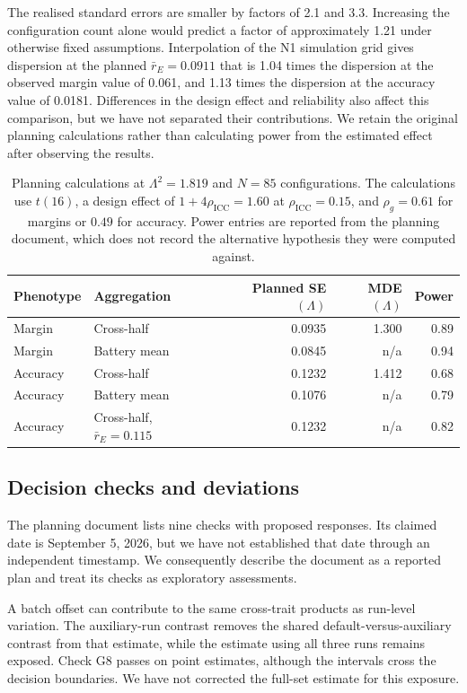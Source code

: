 The realised standard errors are smaller by factors of 2.1 and 3.3. Increasing the configuration count alone would predict a factor of approximately 1.21 under otherwise fixed assumptions. Interpolation of the N1 simulation grid gives dispersion at the planned $\bar r_E=0.0911$ that is 1.04 times the dispersion at the observed margin value of 0.061, and 1.13 times the dispersion at the accuracy value of 0.0181. Differences in the design effect and reliability also affect this comparison, but we have not separated their contributions. We retain the original planning calculations rather than calculating power from the estimated effect after observing the results.

\begin{table}[!htb]
\centering
\caption{Planning calculations at $\Lambda^2=1.819$ and $N=85$ configurations. The calculations use $t(16)$, a design effect of $1+4\rho_{\mathrm{ICC}}=1.60$ at $\rho_{\mathrm{ICC}}=0.15$, and $\rho_g=0.61$ for margins or $0.49$ for accuracy. Power entries are reported from the planning document, which does not record the alternative hypothesis they were computed against.}
\label{tab:original4}
\small\setlength{\tabcolsep}{4pt}\renewcommand{\arraystretch}{1.12}
\begin{tabular}{llrrr}\toprule
Phenotype & Aggregation & Planned SE$(\Lambda)$ & MDE$(\Lambda)$ & Power\\\midrule
Margin & Cross-half & 0.0935 & 1.300 & 0.89\\
Margin & Battery mean & 0.0845 & n/a & 0.94\\
Accuracy & Cross-half & 0.1232 & 1.412 & 0.68\\
Accuracy & Battery mean & 0.1076 & n/a & 0.79\\
Accuracy & Cross-half, $\bar r_E=0.115$ & 0.1232 & n/a & 0.82\\\bottomrule
\end{tabular}
\end{table}

\subsection{Decision checks and deviations}
The planning document lists nine checks with proposed responses. Its claimed date is September 5, 2026, but we have not established that date through an independent timestamp. We consequently describe the document as a reported plan and treat its checks as exploratory assessments.

A batch offset can contribute to the same cross-trait products as run-level variation. The auxiliary-run contrast removes the shared default-versus-auxiliary contrast from that estimate, while the estimate using all three runs remains exposed. Check G8 passes on point estimates, although the intervals cross the decision boundaries. We have not corrected the full-set estimate for this exposure.

